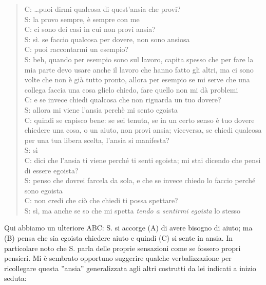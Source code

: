 \begin{verse}
C: \ldots{}puoi dirmi qualcosa di quest'ansia che provi?\\
S: la provo sempre, è sempre con me\\
C: ci sono dei casi in cui non provi ansia?\\
S: sì. se faccio qualcosa per dovere, non sono ansiosa\\
C: puoi raccontarmi un esempio?\\
S: beh, quando per esempio sono sul lavoro, capita spesso che per fare la mia parte devo usare anche il lavoro che hanno fatto gli altri, ma ci sono volte che non è già tutto pronto, allora per esempio se mi serve che una collega faccia una cosa glielo chiedo, fare quello non mi dà problemi\\
C: e se invece chiedi qualcosa che non riguarda un tuo dovere?\\
S: allora mi viene l'ansia perchè mi sento egoista\\
C: quindi se capisco bene: se sei tenuta, se in un certo senso è tuo dovere chiedere una cosa, o un aiuto, non provi ansia; viceversa, se chiedi qualcosa per una tua libera scelta, l'ansia si manifesta?\\
S: sì\\
C: dici che l'ansia ti viene perché ti senti egoista; mi stai dicendo che pensi di essere  egoista?\\
S: penso che dovrei farcela da sola, e che se invece chiedo lo faccio perché sono egoista\\
C: non credi che ciò che chiedi ti possa spettare?\\
S: sì, ma anche se so che mi spetta \emph{tendo a sentirmi egoista} lo stesso
\end{verse}

\noindent Qui abbiamo un ulteriore ABC: S. si accorge (A) di avere bisogno di aiuto; ma (B) pensa che sia egoista chiedere aiuto e quindi (C) si sente in ansia. In particolare noto che S. parla delle proprie sensazioni come se fossero propri pensieri.
Mi è sembrato opportuno suggerire qualche verbalizzazione per ricollegare questa ''ansia'' generalizzata agli altri costrutti da lei indicati a inizio seduta:

